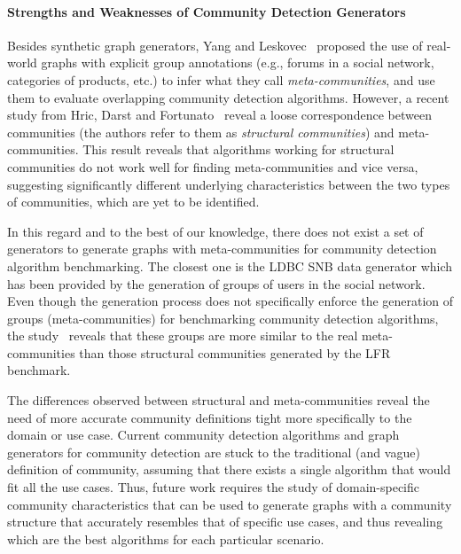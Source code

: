 \paragraph{Strengths and Weaknesses of Community Detection Generators}
Besides synthetic graph generators, Yang and Leskovec~\cite{yang2015defining}
proposed the use of real-world graphs with explicit group annotations (e.g.,
forums in a social network, categories of products, etc.) to infer what they
call \emph{meta-communities}, and use them to evaluate overlapping community
detection algorithms. However, a recent study from Hric, Darst and
Fortunato~\cite{hric2014community} reveal a loose correspondence between
communities (the authors refer to them as \emph{structural communities}) and
meta-communities.  This result reveals that  algorithms working for structural
communities do not work well for finding meta-communities and vice versa,
suggesting significantly different underlying characteristics
between the two types of communities, which are yet to be
identified.

In this regard and to the best of our knowledge, there does not exist a set of
generators to generate graphs with meta-communities for community detection
algorithm benchmarking. The closest one is the LDBC SNB data
generator which has been provided by the
generation of groups of users in the social network. Even though the generation
process does not specifically enforce the generation of groups
(meta-communities) for benchmarking community detection algorithms, the study~\cite{Prat-Perez:2014:CSS:2621934.2621942} reveals that these groups are more similar
to the real meta-communities than those structural communities generated by the
LFR benchmark.

The differences observed between structural and meta-communities reveal the need
of more accurate community definitions tight more specifically to the domain or
use case. Current community detection algorithms and graph generators for
community detection are stuck to the traditional (and vague) definition of
community, assuming that there exists a single algorithm that would fit all the
use cases. Thus, future work requires the study of domain-specific community
characteristics that can be used to generate graphs with a community structure
that accurately resembles that of specific use cases, and thus revealing which
are the best algorithms for each particular scenario.

